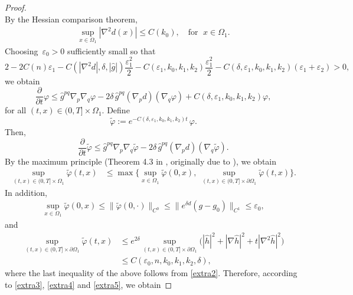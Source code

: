 \documentclass[12pt]{amsart}
\begin{document}
\begin{proof}
\begin{equation}
\end{equation} 
By the Hessian comparison theorem, 
\begin{align*}
    \sup_{x\in \Omega_1}|\nabla^2 d(x)| \leq C(k_0),\quad \text{for }\; x \in \Omega_1. 
\end{align*}
Choosing $\,\varepsilon_0 > 0$ sufficiently small so that
\[
2 - 2C(n)\varepsilon_1 - C(|\nabla^2 d|, \delta, |\hat{g}|)\frac{\varepsilon_1^2}{2} - C(\varepsilon_1, k_0, k_1, k_2)\frac{\varepsilon_1^2}{2} - C(\delta, \varepsilon_1, k_0, k_1, k_2)(\varepsilon_1 + \varepsilon_2) > 0,
\]
we obtain
\[
\frac{\partial}{\partial t} \varphi \leq \hat{g}^{pq} \nabla_p \nabla_q \varphi - 2\delta\, \hat{g}^{pq} (\nabla_p d)(\nabla_q \varphi) + C(\delta, \varepsilon_1, k_0, k_1, k_2)\varphi,
\]
for all $(t,x) \in (0,T] \times \Omega_1$. Define
\[
\tilde{\varphi} := e^{-C(\delta, \varepsilon_1, k_0, k_1, k_2)t} \, \varphi.
\]
Then,
\[
\frac{\partial}{\partial t} \tilde{\varphi} \leq \hat{g}^{pq} \nabla_p \nabla_q \tilde{\varphi} - 2\delta \, \hat{g}^{pq} (\nabla_p d)(\nabla_q \tilde{\varphi}).
\]
By the maximum principle (Theorem 4.3 in \cite{QSW2013}, originally due to \cite{LT1992}), we obtain
\begin{equation}\label{extra3}
    \begin{split}
        \sup_{(t, x)\in(0, T]\times\Omega_{1}} \tilde{\varphi}(t, x)
        &\leq \max\Big\{\sup_{x\in \Omega_{1}} \tilde{\varphi}(0, x),\; \sup_{(t, x)\in (0, T]\times\partial \Omega_{1}} \tilde{\varphi}(t, x)\Big\}. 
    \end{split}
\end{equation}
In addition, 
\begin{align}\label{extra4}
    \sup_{x\in\Omega_{1}} \tilde{\varphi}(0, x)
    \leq \|\tilde{\varphi}(0, \cdot)\|_{C^0}
    \leq \|e^{\delta d}(g - g_0)\|_{C^1}
    \leq \varepsilon_0,
\end{align}
and
\begin{equation}\label{extra5}
    \begin{split}
        \sup_{(t, x) \in (0, T] \times \partial \Omega_{1}} \tilde{\varphi}(t, x)
        &\leq e^{2\delta} \sup_{(t, x)\in (0, T]\times \partial\Omega_1} \big(|\hat{h}|^2 + |\nabla \hat{h}|^2 + t|\nabla^2 \hat{h}|^2\big) \\
        &\leq C(\varepsilon_0, n, k_0, k_1, k_2, \delta),
    \end{split}
\end{equation}
where the last inequality of the above follows from \eqref{extra2}. Therefore, according to \eqref{extra3}, \eqref{extra4} and \eqref{extra5}, we obtain

\end{proof}
\end{document}
